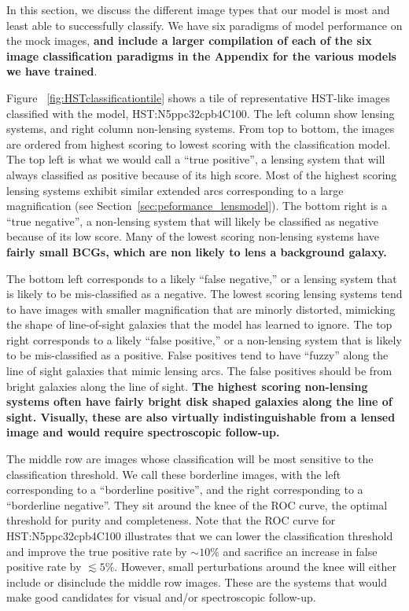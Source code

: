 \documentclass{emulateapj}
\newcommand{\todo}[1]{{\bf\color{blue} #1}}
\def\lsim{\lesssim}
\begin{document}
In this section, we discuss the different image types that our model
is most and least able to successfully classify.  We have six
paradigms of model performance on the mock images, \todo{and include a
larger compilation of each of the six image classification paradigms
in the Appendix for the various models we have trained}.

Figure ~\ref{fig:HSTclassificationtile} shows a tile of representative
HST-like images classified with the model, HST:N5ppc32cpb4C100.  The
left column show lensing systems, and right column non-lensing
systems.  From top to bottom, the images are ordered from highest
scoring to lowest scoring with the classification model.  The top left
is what we would call a ``true positive'', a lensing system that will
always classified as positive because of its high score.  Most of the
highest scoring lensing systems exhibit similar extended arcs
corresponding to a large magnification (see
Section~\ref{sec:peformance_lensmodel}).  The bottom right is a ``true
negative'', a non-lensing system that will likely be classified as
negative because of its low score.  Many of the lowest scoring
non-lensing systems have \todo{fairly small BCGs, which are non likely
  to lens a background galaxy.}

The bottom left corresponds to a likely ``false negative,'' or a
lensing system that is likely to be mis-classified as a negative.  The
lowest scoring lensing systems tend to have images with smaller
magnification that are minorly distorted, mimicking the shape of
line-of-sight galaxies that the model has learned to ignore.  The top
right corresponds to a likely ``false positive,'' or a non-lensing
system that is likely to be mis-classified as a positive.  False
positives tend to have ``fuzzy'' along the line of sight galaxies that
mimic lensing arcs.  The false positives should be from bright
galaxies along the line of sight.  \todo{The highest scoring
  non-lensing systems often have fairly bright disk shaped galaxies
  along the line of sight.  Visually, these are also virtually
  indistinguishable from a lensed image and would require
  spectroscopic follow-up.}

The middle row are images whose classification will be most sensitive
to the classification threshold.  We call these borderline images,
with the left corresponding to a ``borderline positive'', and the
right corresponding to a ``borderline negative''.  They sit around the
knee of the ROC curve, the optimal threshold for purity and
completeness.  Note that the ROC curve for HST:N5ppc32cpb4C100
illustrates that we can lower the classification threshold and improve
the true positive rate by $\sim10\%$ and sacrifice an increase in
false positive rate by $\lsim5\%$.  However, small perturbations
around the knee will either include or disinclude the middle row
images.  These are the systems that would make good candidates for
visual and/or spectroscopic follow-up.
\end{document}
